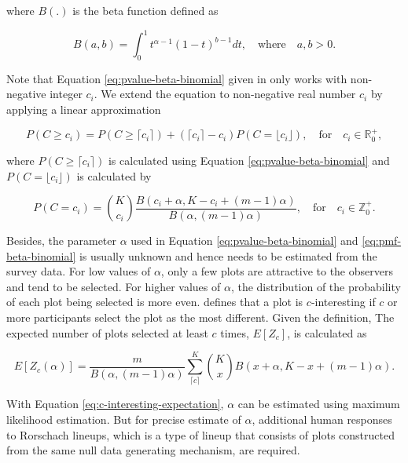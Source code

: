 \documentclass[]{interact}
\theoremstyle{plain}%
\theoremstyle{definition}
\theoremstyle{remark}
\begin{document}
\noindent where \(B(.)\) is the beta function defined as

\begin{equation} \label{eq:betafunction}
B(a, b) = \int_{0}^{1}t^{\alpha - 1}(1-t)^{b-1}dt,\quad \text{where}\quad a,b>0.
\end{equation}

Note that Equation \ref{eq:pvalue-beta-binomial} given in
\citet{vanderplas2021statistical} only works with non-negative integer
\(c_i\). We extend the equation to non-negative real number \(c_i\) by
applying a linear approximation

\begin{equation} \label{eq:pvalue-beta-binomial-approx}
P(C \geq c_i) = P(C \geq \lceil c_i \rceil) + (\lceil c_i \rceil - c_i) P(C = \lfloor c_i \rfloor), \quad \text{for}\quad c_i \in \mathbb{R}_0^+,
\end{equation}

\noindent where \(P(C \geq \lceil c_i \rceil)\) is calculated using
Equation \ref{eq:pvalue-beta-binomial} and
\(P(C = \lfloor c_i \rfloor)\) is calculated by

\begin{equation} \label{eq:pmf-beta-binomial}
P(C = c_i) = {K \choose c_i}\frac{B(c_i + \alpha, K - c_i + (m - 1)\alpha)}{B(\alpha, (m-1)\alpha)},\quad \text{for} \quad c_i \in \mathbb{Z}_0^+.
\end{equation}

Besides, the parameter \(\alpha\) used in Equation
\ref{eq:pvalue-beta-binomial} and \ref{eq:pmf-beta-binomial} is usually
unknown and hence needs to be estimated from the survey data. For low
values of \(\alpha\), only a few plots are attractive to the observers
and tend to be selected. For higher values of \(\alpha\), the
distribution of the probability of each plot being selected is more
even. \citet{vanderplas2021statistical} defines that a plot is
\(c\)-interesting if \(c\) or more participants select the plot as the
most different. Given the definition, The expected number of plots
selected at least \(c\) times, \(E[Z_c]\), is calculated as

\begin{equation} \label{eq:c-interesting-expectation}
E[Z_c(\alpha)] = \frac{m}{B(\alpha, (m-1)\alpha)}\sum_{\lceil c \rceil}^{K}{K \choose x} B(x + \alpha, K - x + (m-1)\alpha).\end{equation}

With Equation \ref{eq:c-interesting-expectation}, \(\alpha\) can be
estimated using maximum likelihood estimation. But for precise estimate
of \(\alpha\), additional human responses to Rorschach lineups, which is
a type of lineup that consists of plots constructed from the same null
data generating mechanism, are required.
\end{document}
